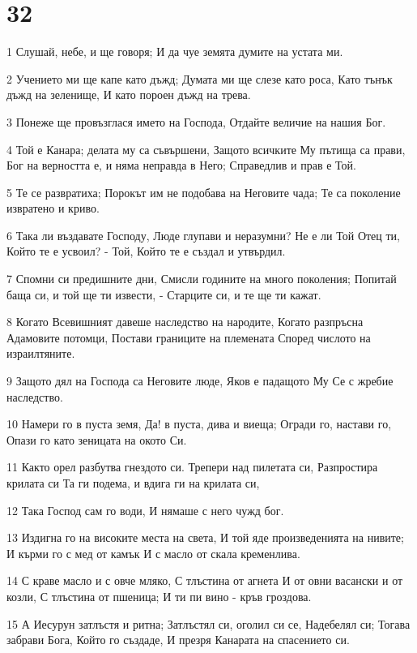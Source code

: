 \chapter{32}

\par 1 Слушай, небе, и ще говоря; И да чуе земята думите на устата ми.
\par 2 Учението ми ще капе като дъжд; Думата ми ще слезе като роса, Като тънък дъжд на зеленище, И като пороен дъжд на трева.
\par 3 Понеже ще провъзглася името на Господа, Отдайте величие на нашия Бог.
\par 4 Той е Канара; делата му са съвършени, Защото всичките Му пътища са прави, Бог на верността е, и няма неправда в Него; Справедлив и прав е Той.
\par 5 Те се развратиха; Порокът им не подобава на Неговите чада; Те са поколение извратено и криво.
\par 6 Така ли въздавате Господу, Люде глупави и неразумни? Не е ли Той Отец ти, Който те е усвоил? - Той, Който те е създал и утвърдил.
\par 7 Спомни си предишните дни, Смисли годините на много поколения; Попитай баща си, и той ще ти извести, - Старците си, и те ще ти кажат.
\par 8 Когато Всевишният давеше наследство на народите, Когато разпръсна Адамовите потомци, Постави границите на племената Според числото на израилтяните.
\par 9 Защото дял на Господа са Неговите люде, Яков е падащото Му Се с жребие наследство.
\par 10 Намери го в пуста земя, Да! в пуста, дива и виеща; Огради го, настави го, Опази го като зеницата на окото Си.
\par 11 Както орел разбутва гнездото си. Трепери над пилетата си, Разпростира крилата си Та ги подема, и вдига ги на крилата си,
\par 12 Така Господ сам го води, И нямаше с него чужд бог.
\par 13 Издигна го на високите места на света, И той яде произведенията на нивите; И кърми го с мед от камък И с масло от скала кременлива.
\par 14 С краве масло и с овче мляко, С тлъстина от агнета И от овни васански и от козли, С тлъстина от пшеница; И ти пи вино - кръв гроздова.
\par 15 А Иесурун затлъстя и ритна; Затлъстял си, оголил си се, Надебелял си; Тогава забрави Бога, Който го създаде, И презря Канарата на спасението си.
